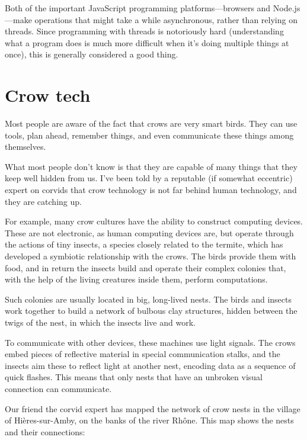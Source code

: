 Both of the important JavaScript programming platforms—browsers and Node.js—make operations that might take a while asynchronous, rather than relying on threads. Since programming with threads is notoriously hard (understanding what a program does is much more difficult when it's doing multiple things at once), this is generally considered a good thing.

\section{Crow tech}

Most people are aware of the fact that crows are very smart birds. They can use tools, plan ahead, remember things, and even communicate these things among themselves.

What most people don't know is that they are capable of many things that they keep well hidden from us. I've been told by a reputable (if somewhat eccentric) expert on corvids that crow technology is not far behind human technology, and they are catching up.

For example, many crow cultures have the ability to construct computing devices. These are not electronic, as human computing devices are, but operate through the actions of tiny insects, a species closely related to the termite, which has developed a symbiotic relationship with the crows. The birds provide them with food, and in return the insects build and operate their complex colonies that, with the help of the living creatures inside them, perform computations.

Such colonies are usually located in big, long-lived nests. The birds and insects work together to build a network of bulbous clay structures, hidden between the twigs of the nest, in which the insects live and work.

To communicate with other devices, these machines use light signals. The crows embed pieces of reflective material in special communication stalks, and the insects aim these to reflect light at another nest, encoding data as a sequence of quick flashes. This means that only nests that have an unbroken visual connection can communicate.

Our friend the corvid expert has mapped the network of crow nests in the village of Hières-sur-Amby, on the banks of the river Rhône. This map shows the nests and their connections:

